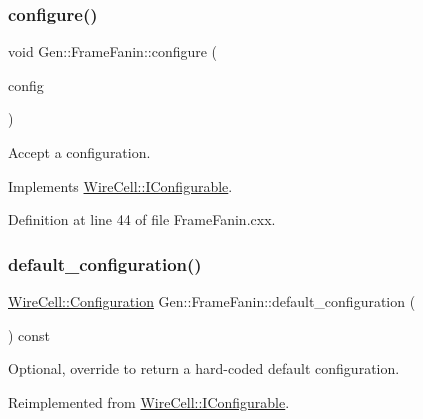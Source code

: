 \subsubsection{\texorpdfstring{configure()}{configure()}}
{\footnotesize\ttfamily void Gen\+::\+Frame\+Fanin\+::configure (\begin{DoxyParamCaption}\item[{const \hyperlink{namespace_wire_cell_a9f705541fc1d46c608b3d32c182333ee}{Wire\+Cell\+::\+Configuration} \&}]{config }\end{DoxyParamCaption})\hspace{0.3cm}{\ttfamily [virtual]}}



Accept a configuration. 



Implements \hyperlink{class_wire_cell_1_1_i_configurable_a57ff687923a724093df3de59c6ff237d}{Wire\+Cell\+::\+I\+Configurable}.



Definition at line 44 of file Frame\+Fanin.\+cxx.

\mbox{\label{class_wire_cell_1_1_gen_1_1_frame_fanin_af2d38dac772719f126da9892a68818b2}} 
\subsubsection{\texorpdfstring{default\+\_\+configuration()}{default\_configuration()}}
{\footnotesize\ttfamily \hyperlink{namespace_wire_cell_a9f705541fc1d46c608b3d32c182333ee}{Wire\+Cell\+::\+Configuration} Gen\+::\+Frame\+Fanin\+::default\+\_\+configuration (\begin{DoxyParamCaption}{ }\end{DoxyParamCaption}) const\hspace{0.3cm}{\ttfamily [virtual]}}



Optional, override to return a hard-\/coded default configuration. 



Reimplemented from \hyperlink{class_wire_cell_1_1_i_configurable_a54841b2da3d1ea02189478bff96f7998}{Wire\+Cell\+::\+I\+Configurable}.



